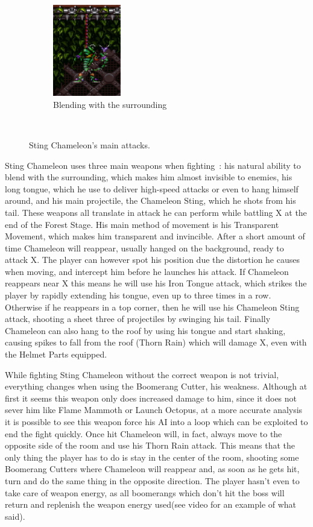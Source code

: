 \begin{figure}[htp]
	\begin{subfigure}[t]{0.3\linewidth}
		\centering
		\includegraphics[height=4cm]{figures/X1/Sting_chameleon/Chameleon_blend.jpg}
		\caption{Blending with the surrounding}
	\end{subfigure}\\
	\caption{Sting Chameleon's main attacks.}
\end{figure} 
Sting Chameleon uses three main weapons when fighting~\cite{wiki:Sting_chameleon}: his natural ability to blend with the surrounding, which makes him almost invisible to enemies, his long tongue, which he use to deliver high-speed attacks or even to hang himself around, and his main projectile, the Chameleon Sting, which he shots from his tail. These weapons all translate in attack he can perform while battling X at the end of the Forest Stage. His main method of movement is his Transparent Movement, which makes him transparent and invincible. After a short amount of time Chameleon will reappear, usually hanged on the background, ready to attack X. The player can however spot his position due the distortion he causes when moving, and intercept him before he launches his attack. If Chameleon reappears near X this means he will use his Iron Tongue attack, which strikes the player by rapidly extending his tongue, even up to three times in a row. Otherwise if he reappears in a top corner, then he will use his Chameleon Sting attack, shooting a sheet three of projectiles by swinging his tail. Finally Chameleon can also hang to the roof by using his tongue and start shaking, causing spikes to fall from the roof (Thorn Rain) which will damage X, even with the Helmet Parts equipped.


While fighting Sting Chameleon without the correct weapon is not trivial, everything changes when using the Boomerang Cutter, his weakness. Although at first it seems this weapon only does increased damage to him, since it does not sever him like Flame Mammoth or Launch Octopus, at a more accurate analysis it is possible to see this weapon force his AI into a loop which can be exploited to end the fight quickly. Once hit Chameleon will, in fact, always move to the opposite side of the room and use his Thorn Rain attack. This means that the only thing the player has to do is stay in the center of the room, shooting some Boomerang Cutters where Chameleon will reappear and, as soon as he gets hit, turn and do the same thing in the opposite direction. The player hasn't even to take care of weapon energy, as all boomerangs which don't hit the boss will return and replenish the weapon energy used(see video  for an example of what said).  

